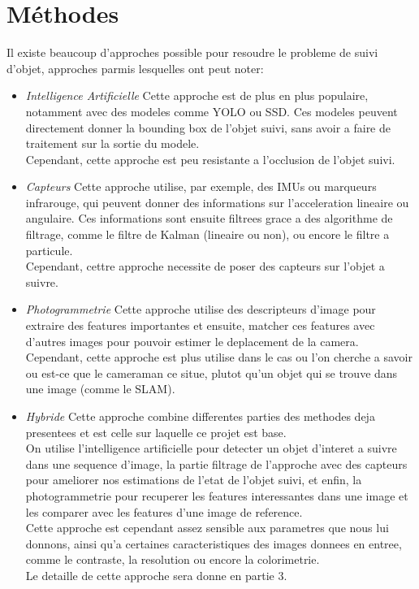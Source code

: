 \clearpage
\section{Méthodes}
Il existe beaucoup d'approches possible pour resoudre le probleme de suivi d'objet, approches parmis lesquelles ont peut noter:
\begin{itemize}
	\item \textit{Intelligence Artificielle}\newline
	Cette approche est de plus en plus populaire, notamment avec des modeles comme YOLO ou SSD. Ces modeles peuvent directement donner la bounding box de l'objet suivi, sans avoir a faire de traitement sur la sortie du modele.\\
	Cependant, cette approche est peu resistante a l'occlusion de l'objet suivi.\\
	
	\item \textit{Capteurs}\newline
	Cette approche utilise, par exemple, des IMUs ou marqueurs infrarouge, qui peuvent donner des informations sur l'acceleration lineaire ou angulaire. Ces informations sont ensuite filtrees grace a des algorithme de filtrage, comme le filtre de Kalman (lineaire ou non), ou encore le filtre a particule.\\
	Cependant, cettre approche necessite de poser des capteurs sur l'objet a suivre.\\
	
	\item \textit{Photogrammetrie}\newline
	Cette approche utilise des descripteurs d'image pour extraire des features importantes et ensuite, matcher ces features avec d'autres images pour pouvoir estimer le deplacement de la camera.\\
	Cependant, cette approche est plus utilise dans le cas ou l'on cherche a savoir ou est-ce que le cameraman ce situe, plutot qu'un objet qui se trouve dans une image (comme le SLAM).\\
	
	\item \textit{Hybride}\newline
	Cette approche combine differentes parties des methodes deja presentees et est celle sur laquelle ce projet est base.\\
	On utilise l'intelligence artificielle pour detecter un objet d'interet a suivre dans une sequence d'image, la partie filtrage de l'approche avec des capteurs pour ameliorer nos estimations de l'etat de l'objet suivi, et enfin, la photogrammetrie pour recuperer les features interessantes dans une image et les comparer avec les features d'une image de reference.\\
	Cette approche est cependant assez sensible aux parametres que nous lui donnons, ainsi qu'a certaines caracteristiques des images donnees en entree, comme le contraste, la resolution ou encore la colorimetrie.\\
	Le detaille de cette approche sera donne en partie 3.\\
\end{itemize}




